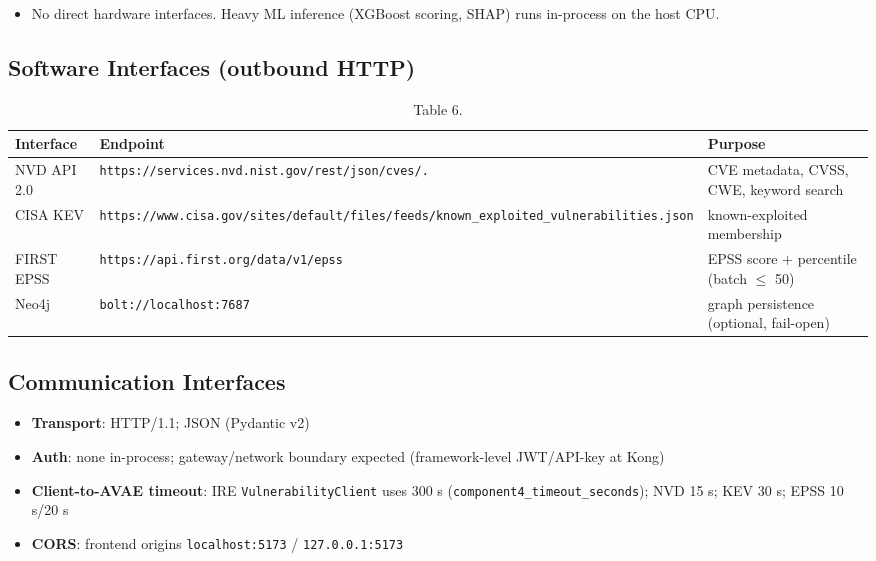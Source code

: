 \documentclass[10pt,journal,onecolumn]{IEEEtran}
\begin{document}
\begin{itemize}
\item No direct hardware interfaces. Heavy ML inference (XGBoost scoring, SHAP) runs in-process on the host CPU.
\end{itemize}

\subsection{Software Interfaces (outbound HTTP)}

\begin{table}[h]
\caption{Table 6.}
\label{tab:t6}
\begin{tabularx}{\columnwidth}{l >{\raggedright\arraybackslash}X >{\raggedright\arraybackslash}X}
\toprule
\textbf{Interface} & \textbf{Endpoint} & \textbf{Purpose}\\
\midrule
NVD API 2.0 & \texttt{https:\allowbreak /\allowbreak /\allowbreak services.\allowbreak nvd.\allowbreak nist.\allowbreak gov/\allowbreak rest/\allowbreak json/\allowbreak cves/\allowbreak 2.\allowbreak 0} & CVE metadata, CVSS, CWE, keyword search\\
CISA KEV & \texttt{https:\allowbreak /\allowbreak /\allowbreak www.\allowbreak cisa.\allowbreak gov/\allowbreak sites/\allowbreak default/\allowbreak files/\allowbreak feeds/\allowbreak known\_\allowbreak exploited\_\allowbreak vulnerabilities.\allowbreak json} & known-exploited membership\\
FIRST EPSS & \texttt{https:\allowbreak /\allowbreak /\allowbreak api.\allowbreak first.\allowbreak org/\allowbreak data/\allowbreak v1/\allowbreak epss} & EPSS score + percentile (batch $\leq$ 50)\\
Neo4j & \texttt{bolt://localhost:7687} & graph persistence (optional, fail-open)\\
\bottomrule
\end{tabularx}
\end{table}

\subsection{Communication Interfaces}

\begin{itemize}
\item \textbf{Transport}: HTTP/1.1; JSON (Pydantic v2)
\item \textbf{Auth}: none in-process; gateway/network boundary expected (framework-level JWT/API-key at Kong)
\item \textbf{Client-to-AVAE timeout}: IRE \texttt{VulnerabilityClient} uses 300 s (\texttt{component4\_\allowbreak timeout\_\allowbreak seconds}); NVD 15 s; KEV 30 s; EPSS 10 s/20 s
\item \textbf{CORS}: frontend origins \texttt{localhost:5173} / \texttt{127.0.0.1:5173}
\end{itemize}
\end{document}
